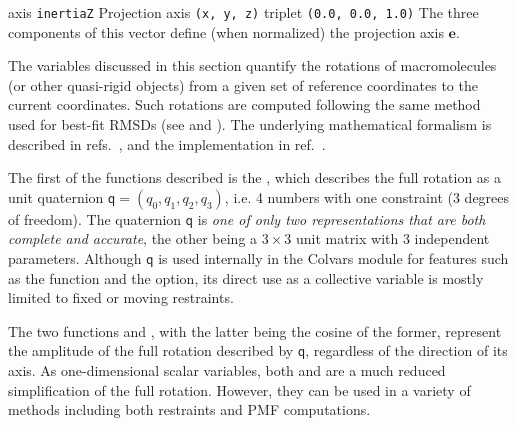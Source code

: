 \begin{cvcoptions}
\item %
\item %
  \keydef
    {axis}{%
    \texttt{inertiaZ}}{%
    Projection axis}{%
    \texttt{(x, y, z)} triplet}{%
    \texttt{(0.0, 0.0, 1.0)}}{%
    The three components of this vector define (when normalized) the
    projection axis $\mathbf{e}$.}
\end{cvcoptions}



The variables discussed in this section quantify the rotations of macromolecules (or other quasi-rigid objects) from a given set of reference coordinates to the current coordinates.
Such rotations are computed following the same method used for best-fit RMSDs (see  and ).
The underlying mathematical formalism is described in refs.\ \citealp{Coutsias2004,Daniilidis1999,Hu2006}, and the implementation in ref.\ \citealp{Fiorin2013}.

The first of the functions described is the , which describes the full rotation as a unit quaternion $\mathsf{q} = (q_0, q_1, q_2, q_3)$, i.e.{} 4 numbers with one constraint (3 degrees of freedom).
The quaternion $\mathsf{q}$ is \emph{one of only two representations that are both complete and accurate}, the other being a $3\times{}3$ unit matrix with 3 independent parameters.
Although $\mathsf{q}$ is used internally in the Colvars module for features such as the  function and the  option, its direct use as a collective variable is mostly limited to fixed or moving restraints.

The two functions  and , with the latter being the cosine of the former, represent the amplitude of the full rotation described by $\mathsf{q}$, regardless of the direction of its axis.
As one-dimensional scalar variables, both  and  are a much reduced simplification of the full rotation.
However, they can be used in a variety of methods including both restraints and PMF computations.


